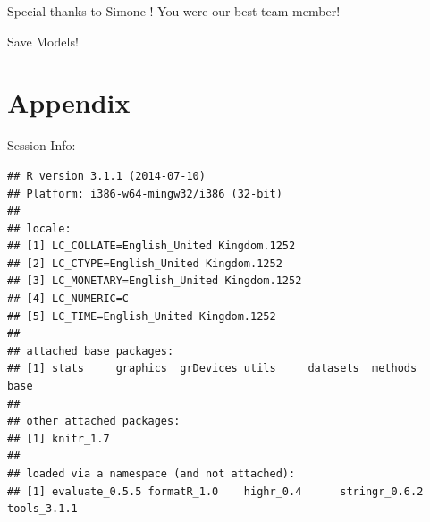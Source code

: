 \documentclass[11pt, a4paper]{article}\usepackage[]{graphicx}\usepackage[]{color}
\makeatletter
\newenvironment{kframe}{%
 \def\at@end@of@kframe{}%
 \ifinner\ifhmode%
  \def\at@end@of@kframe{\end{minipage}}%
  \begin{minipage}{\columnwidth}%
 \fi\fi%
 \def\FrameCommand##1{\hskip\@totalleftmargin \hskip-\fboxsep
 \colorbox{shadecolor}{##1}\hskip-\fboxsep
     \hskip-\linewidth \hskip-\@totalleftmargin \hskip\columnwidth}%
 \MakeFramed {\advance\hsize-\width
   \@totalleftmargin\z@ \linewidth\hsize
   \@setminipage}}%
 {\par\unskip\endMakeFramed%
 \at@end@of@kframe}
\newenvironment{knitrout}{}{} %
\makeatother
\begin{document}
Special thanks to   Simone  ! You were our best team member! 

Save Models!

\section{Appendix}

Session Info:
\begin{knitrout}
\color{fgcolor}\begin{kframe}
\begin{verbatim}
## R version 3.1.1 (2014-07-10)
## Platform: i386-w64-mingw32/i386 (32-bit)
## 
## locale:
## [1] LC_COLLATE=English_United Kingdom.1252 
## [2] LC_CTYPE=English_United Kingdom.1252   
## [3] LC_MONETARY=English_United Kingdom.1252
## [4] LC_NUMERIC=C                           
## [5] LC_TIME=English_United Kingdom.1252    
## 
## attached base packages:
## [1] stats     graphics  grDevices utils     datasets  methods   base     
## 
## other attached packages:
## [1] knitr_1.7
## 
## loaded via a namespace (and not attached):
## [1] evaluate_0.5.5 formatR_1.0    highr_0.4      stringr_0.6.2  tools_3.1.1
\end{verbatim}
\end{kframe}
\end{knitrout}

{}

\end{document}
